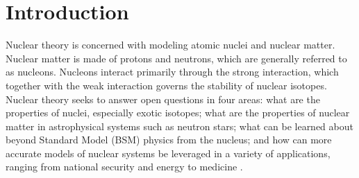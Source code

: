 \chapter{Introduction}\label{introduction}



Nuclear theory is concerned with modeling atomic nuclei and nuclear matter. Nuclear matter is made of protons and neutrons, which are generally referred to as nucleons. Nucleons interact primarily through the strong interaction, which together with the weak interaction governs the stability of nuclear isotopes. Nuclear theory seeks to answer open questions in four areas: what are the properties of nuclei, especially exotic isotopes; what are the properties of nuclear matter in astrophysical systems such as neutron stars; what can be learned about beyond Standard Model (BSM) physics from the nucleus; and how can more accurate models of nuclear systems be leveraged in a variety of applications, ranging from national security and energy to medicine \cite{aprahamian2015reaching}.

